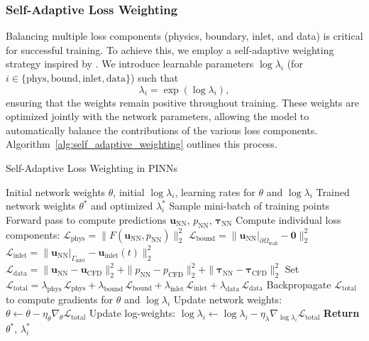 \documentclass[12pt, a4paper]{article}
\begin{document}
\subsubsection{Self-Adaptive Loss Weighting}
\label{sec:self_adaptive_weighting}
Balancing multiple loss components (physics, boundary, inlet, and data) is critical for successful training. To achieve this, we employ a self-adaptive weighting strategy inspired by \citet{mcclenny2020self}. We introduce learnable parameters $\log \lambda_i$ (for $i\in\{\mathrm{phys}, \mathrm{bound}, \mathrm{inlet}, \mathrm{data}\}$) such that
\[
\lambda_i = \exp(\log \lambda_i),
\]
ensuring that the weights remain positive throughout training. These weights are optimized jointly with the network parameters, allowing the model to automatically balance the contributions of the various loss components. Algorithm~\ref{alg:self_adaptive_weighting} outlines this process.

\begin{algorithm}[htbp]
    \caption{Self-Adaptive Loss Weighting in PINNs}
    \label{alg:self_adaptive_weighting}
    \begin{algorithmic}[1]
    \Require Initial network weights $\theta$, initial $\log \lambda_i$, learning rates for $\theta$ and $\log \lambda_i$
    \Ensure Trained network weights $\theta^*$ and optimized $\lambda_i^*$
        \State Sample mini-batch of training points
        \State Forward pass to compute predictions $\mathbf{u}_{\mathrm{NN}}$, $p_{\mathrm{NN}}$, $\boldsymbol{\tau}_{\mathrm{NN}}$
        \State Compute individual loss components:
        \State \quad $\mathcal{L}_{\mathrm{phys}} = \|F(\mathbf{u}_{\mathrm{NN}},p_{\mathrm{NN}})\|_2^2$
        \State \quad $\mathcal{L}_{\mathrm{bound}} = \|\mathbf{u}_{\mathrm{NN}}|_{\partial\Omega_{\mathrm{wall}}} - \mathbf{0}\|_2^2$
        \State \quad $\mathcal{L}_{\mathrm{inlet}} = \|\mathbf{u}_{\mathrm{NN}}|_{\Gamma_{\mathrm{inlet}}} - \mathbf{u}_{\mathrm{inlet}}(t)\|_2^2$
        \State \quad $\mathcal{L}_{\mathrm{data}} = \|\mathbf{u}_{\mathrm{NN}} - \mathbf{u}_{\mathrm{CFD}}\|_2^2 + \|p_{\mathrm{NN}} - p_{\mathrm{CFD}}\|_2^2 + \|\boldsymbol{\tau}_{\mathrm{NN}} - \boldsymbol{\tau}_{\mathrm{CFD}}\|_2^2$
        \State Set $\mathcal{L}_{\mathrm{total}} = \lambda_{\mathrm{phys}}\,\mathcal{L}_{\mathrm{phys}} + \lambda_{\mathrm{bound}}\,\mathcal{L}_{\mathrm{bound}} + \lambda_{\mathrm{inlet}}\,\mathcal{L}_{\mathrm{inlet}} + \lambda_{\mathrm{data}}\,\mathcal{L}_{\mathrm{data}}$
        \State Backpropagate $\mathcal{L}_{\mathrm{total}}$ to compute gradients for $\theta$ and $\log \lambda_i$
        \State Update network weights: $\theta \leftarrow \theta - \eta_\theta \nabla_{\theta}\mathcal{L}_{\mathrm{total}}$
        \State Update log-weights: $\log \lambda_i \leftarrow \log \lambda_i - \eta_\lambda \nabla_{\log \lambda_i}\mathcal{L}_{\mathrm{total}}$
    \EndWhile
    \State \textbf{Return} $\theta^*$, $\lambda_i^*$
    \end{algorithmic}
\end{algorithm}
\end{document}
